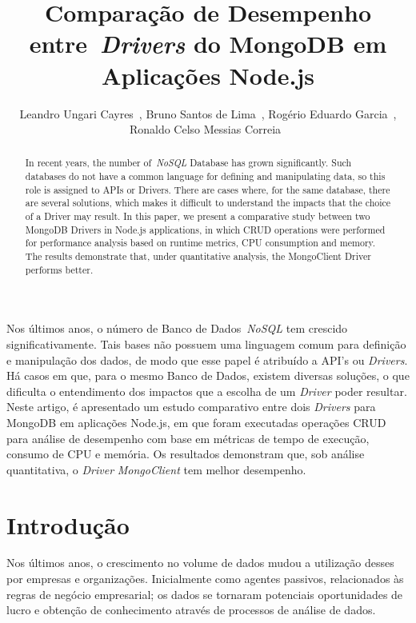 \documentclass[12pt]{article}
\title{Comparação de Desempenho entre~\emph{Drivers} do MongoDB em Aplicações Node.js}
\author{Leandro Ungari Cayres~\inst{1}, Bruno Santos de Lima~\inst{1}, Rogério Eduardo Garcia~\inst{1},\\ Ronaldo Celso Messias Correia~\inst{1}}
\begin{document}
 

\maketitle

\begin{abstract}
In recent years, the number of~\emph{NoSQL} Database has grown significantly. Such databases do not have a common language for defining and manipulating data, so this role is assigned to APIs or Drivers. There are cases where, for the same database, there are several solutions, which makes it difficult to understand the impacts that the choice of a Driver may result. In this paper, we present a comparative study between two MongoDB Drivers in Node.js applications, in which CRUD operations were performed for performance analysis based on runtime metrics, CPU consumption and memory. The results demonstrate that, under quantitative analysis, the MongoClient Driver performs better.
\end{abstract}
     
\begin{resumo} 
Nos últimos anos, o número de Banco de Dados~\emph{NoSQL} tem crescido significativamente. Tais bases não possuem uma linguagem comum para definição e manipulação dos dados, de modo que esse papel é atribuído a API's ou \emph{Drivers}. Há casos em que, para o mesmo Banco de Dados, existem diversas soluções, o que dificulta o entendimento dos impactos que a escolha de um \emph{Driver} poder resultar. Neste artigo, é apresentado um estudo comparativo entre dois \emph{Drivers} para MongoDB em aplicações Node.js, em que foram executadas operações CRUD para análise de desempenho com base em métricas de tempo de execução, consumo de CPU e memória. Os resultados demonstram que, sob análise quantitativa, o \emph{Driver} \emph{MongoClient} tem melhor desempenho.
\end{resumo}


\section{Introdução}
\label{sec:introducao}

Nos últimos anos, o crescimento no volume de dados mudou a utilização desses por empresas e organizações. Inicialmente como agentes passivos, relacionados às regras de negócio empresarial; os dados se tornaram potenciais oportunidades de lucro e obtenção de conhecimento através de processos de análise de dados.
\end{document}
